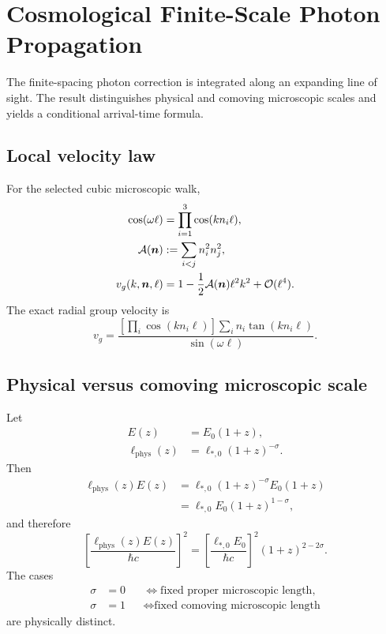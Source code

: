\chapter{Cosmological Finite-Scale Photon Propagation}

The finite-spacing photon correction is integrated along an expanding line of sight.  The result distinguishes physical and comoving microscopic scales and yields a conditional arrival-time formula.

\allowdisplaybreaks

\section{Local velocity law}
For the selected cubic microscopic walk,
\begin{align}
\cos(\omega\ell)&=\prod_{i=1}^3\cos(kn_i\ell),\\
\mathcal A(\bm n)&:=\sum_{i<j}n_i^2n_j^2,\\
v_g(k,\bm n,\ell)
&=1-\frac12\mathcal A(\bm n)\ell^2k^2
+\mathcal O(\ell^4).
\end{align}
The exact radial group velocity is
\begin{equation}
v_g
=\frac{
\displaystyle
\left[\prod_i\cos(kn_i\ell)\right]
\sum_i n_i\tan(kn_i\ell)
}{
\displaystyle
\sin(\omega\ell)
}.
\end{equation}

\section{Physical versus comoving microscopic scale}
Let
\begin{align}
E(z)&=E_0(1+z),\\
\ell_{\mathrm{phys}}(z)
&=\ell_{*,0}(1+z)^{-\sigma}.
\end{align}
Then
\begin{align}
\ell_{\mathrm{phys}}(z)E(z)
&=\ell_{*,0}(1+z)^{-\sigma}
E_0(1+z)\\
&=\ell_{*,0}E_0(1+z)^{1-\sigma},
\end{align}
and therefore
\begin{equation}
\left[\frac{\ell_{\mathrm{phys}}(z)E(z)}{\hbar c}\right]^2
=
\left[\frac{\ell_{*,0}E_0}{\hbar c}\right]^2
(1+z)^{2-2\sigma}.
\end{equation}
The cases
\begin{align}
\sigma&=0
&&\Longleftrightarrow
\text{fixed proper microscopic length},\\
\sigma&=1
&&\Longleftrightarrow
\text{fixed comoving microscopic length}
\end{align}
are physically distinct.

